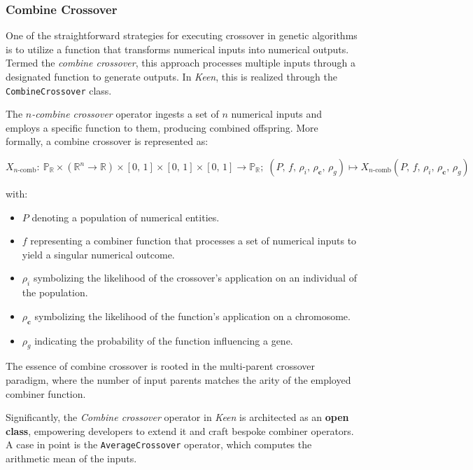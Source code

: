 \subsubsection{Combine Crossover}
\label{sec:keen:op:cx:combine}

  One of the straightforward strategies for executing crossover in genetic 
  algorithms is to utilize a function that transforms numerical inputs into
  numerical outputs. Termed the \textit{combine crossover}, this approach 
  processes multiple inputs through a designated function to generate outputs. 
  In \textit{Keen}, this is realized through the \texttt{CombineCrossover} 
  class.

  \begin{definition}
    The \textit{\(n\)-combine crossover} operator ingests a set of \(n\)
    numerical inputs and employs a specific function to them, producing combined
    offspring. More formally, a combine crossover is represented as:

    \begin{equation}
      X_{n\text{-comb}} :\: 
        \mathbb{P}_\mathbb{R} \times (\mathbb{R}^n \rightarrow \mathbb{R})
          \times [0,\, 1] \times [0,\, 1] \times [0,\, 1] 
            \rightarrow \mathbb{P}_\mathbb{R};\;
        (P,\, f,\, \rho_i,\, \rho_\mathbf{c},\, \rho_g)
          \mapsto X_{n\text{-comb}}(P,\, f,\, \rho_i,\, \rho_\mathbf{c},\, 
            \rho_g)
    \end{equation}

    with:

    \begin{itemize}
      \item \(P\) denoting a population of numerical entities.
      \item \(f\) representing a combiner function that processes a set of 
        numerical inputs to yield a singular numerical outcome.
      \item \(\rho_i\) symbolizing the likelihood of the crossover's application
        on an individual of the population.
      \item \(\rho_\mathbf{c}\) symbolizing the likelihood of the function's 
        application on a chromosome.
      \item \(\rho_g\) indicating the probability of the function influencing a 
        gene.
    \end{itemize}
  \end{definition}

  \begin{remark}
    The essence of combine crossover is rooted in the multi-parent crossover 
    paradigm, where the number of input parents matches the arity of the 
    employed combiner function.
  \end{remark}

  Significantly, the \textit{Combine crossover} operator in \textit{Keen} is 
  architected as an \textbf{open class}, empowering developers to extend it and 
  craft bespoke combiner operators. A case in point is the 
  \texttt{AverageCrossover} operator, which computes the arithmetic mean of the 
  inputs.
